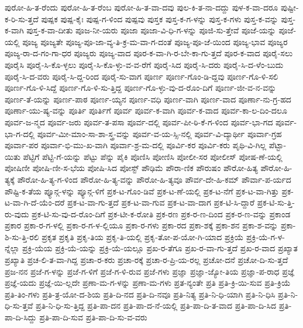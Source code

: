 {ಪುರೋ-ಹಿ-ತ-ರೆಂದು
ಪುರೋ-ಹಿ-ತ-ರೆಂಬ
ಪುರೋ-ಹಿ-ತ-ವಾ-ದವು
ಪುಲ-ಕಿ-ತ-ನಾ-ದದ್ದು
ಪುಳ-ಕ-ವಾ-ದರೂ
ಪುಷ್ಟೀ-ಕ-ರಿ-ಸು-ತ್ತದೆ
ಪುಷ್ಪಕ
ಪುಷ್ಪ-ಕೈಃ
ಪುಷ್ಪ-ಗ-ಳಿಂದ
ಪುಷ್ಪವು
ಪುಸ್ತಕ
ಪುಸ್ತ-ಕ-ಗ-ಳನ್ನು
ಪುಸ್ತ-ಕ-ಗಳು
ಪುಸ್ತ-ಕ-ವನ್ನು
ಪುಸ್ತ-ಕ-ವಾಗಿ
ಪುಸ್ತ-ಕ-ವಾ-ದೀತು
ಪೂಜ-ನೀ-ಯರು
ಪೂಜಾ
ಪೂಜಾ-ವಿ-ಧಿ-ಗ-ಳನ್ನು
ಪೂಜಿ-ಸು-ತ್ತೇವೆ
ಪೂಜೆ-ಯನ್ನು
ಪೂಜೆ-ಯಲ್ಲಿ
ಪೂಜ್ಯ
ಪೂಜ್ಯತೇ
ಪೂಜ್ಯ-ಪೂ-ಜಾ-ವ್ಯ-ತಿ-ಕ್ರ-ಮ-ವಾ-ಗ-ದಂತೆ
ಪೂಜ್ಯ-ಪೂ-ಜೆ-ಯಿಂದ
ಪೂಜ್ಯ-ಭಾವ
ಪೂಜ್ಯರ
ಪೂಜ್ಯ-ರಾ-ದ-ಗಂ-ಗಾ-ಧರ
ಪೂಜ್ಯರು
ಪೂಜ್ಯ-ವಾದ
ಪೂರ-ಕ-ವಾ-ಗಿ-ರ-ಬೇ-ಕಾ-ಗು-ತ್ತದೆ
ಪೂರ-ಕ-ವಾದ
ಪೂರೈ-ಸಲು
ಪೂರೈಸಿ
ಪೂರೈ-ಸಿ-ಕೊ-ಳ್ಳಲು
ಪೂರೈ-ಸಿ-ಕೊ-ಳ್ಳು-ವ-ವ-ರೆಗೆ
ಪೂರೈ-ಸಿದ
ಪೂರೈ-ಸಿ-ದರು
ಪೂರೈ-ಸಿ-ದ-ಳೆಂ-ಬುದು
ಪೂರೈ-ಸಿ-ದ-ವರು
ಪೂರೈ-ಸಿ-ದ್ದ-ರಿಂದ
ಪೂರೈ-ಸು-ವಾಗ
ಪೂರ್ಣ
ಪೂರ್ಣ-ಗೊಂ-ಡಿ-ದ್ದವು
ಪೂರ್ಣ-ಗೊ-ಳಿ-ಸಲಿ
ಪೂರ್ಣ-ಗೊ-ಳಿ-ಸಿದ್ದೆ
ಪೂರ್ಣ-ಗೊ-ಳಿ-ಸು-ತ್ತಿದ್ದ
ಪೂರ್ಣ-ಗೊ-ಳ್ಳು-ವು-ದ-ರೊಂ-ದಿಗೆ
ಪೂರ್ಣ-ಜೀ-ವ-ನ-ವನ್ನು
ಪೂರ್ಣ-ತೆ-ಯನ್ನು
ಪೂರ್ಣ-ಪಾಠ
ಪೂರ್ಣ-ಯ್ಯನ
ಪೂರ್ಣ-ವಧಿ
ಪೂರ್ಣ-ವಾಗಿ
ಪೂರ್ಣ-ವಾದ
ಪೂರ್ಣಾ-ನು-ಗ್ರ-ಹದ
ಪೂರ್ಣಾ-ಯು-ಷ್ಯ-ವನ್ನು
ಪೂರ್ತಿ
ಪೂರ್ತಿಗೆ
ಪೂರ್ವ
ಪೂರ್ವ-ಕ-ವಾಗಿ
ಪೂರ್ವ-ಕ-ವಾದ
ಪೂರ್ವ-ಕಾ-ಲ-ದಿಂ-ದಲೂ
ಪೂರ್ವ-ಜ-ನ್ಮದ
ಪೂರ್ವ-ಜರು
ಪೂರ್ವ-ತ-ಪಸಾ
ಪೂರ್ವ-ದಲ್ಲಿ
ಪೂರ್ವ-ಪೀ-ಠಿ-ಕೆ-ಗ-ಳಿಂದ
ಪೂರ್ವ-ಭಾ-ಗದ
ಪೂರ್ವ-ಭಾ-ಗ-ದಲ್ಲಿ
ಪೂರ್ವ-ಮೀ-ಮಾಂ-ಸಾ-ಶಾ-ಸ್ತ್ರ-ವನ್ನು
ಪೂರ್ವ-ವ-ಯ-ಸ್ಸಿ-ನಲ್ಲಿ
ಪೂರ್ವ-ವಿ-ದ್ಯಾರ್ಥೀ
ಪೂರ್ವಾ-ಗ್ರಹ
ಪೂರ್ವಾ-ಪರ
ಪೂರ್ವಾ-ಭಿ-ಮು-ಖ-ವಾಗಿ
ಪೂರ್ವಾ-ಶ್ರ-ಮ-ದಲ್ಲಿ
ಪೂರ್ವಿ-ಕರ
ಪೂರ್ವಿ-ಕರು
ಪೃಥಿ-ವಿ-ಗಿಲ್ಲ
ಪೆಟ್ಟಾ-ಯಿತು
ಪೆಟ್ಟಿಗೆ
ಪೆಟ್ಟಿ-ಗೆ-ಯನ್ನು
ಪೆಟ್ಟು
ಪೆನ್ನು
ಪೈಕಿ
ಪೊಣಿಸಿ
ಪೋಣಿಸಿ
ಪೋಲೀ-ಸರ
ಪೋಲೀಸ್
ಪೋಷ-ಣೆ-ಯಲ್ಲಿ
ಪೋಷಿಣೀ
ಪೋಷಿ-ಣೀ-ಸ-ಭೆಯ
ಪೋಷಿ-ಸಿದ
ಪೋಸ್ಟ್
ಪೌಢಿಮೆ
ಪೌರಾ-ಣಿಕ
ಪೌರುಷಂ
ಪೌರೋ-ಹಿತ್ಯ
ಪೌರೋ-ಹಿ-ತ್ಯಕ್ಕೆ
ಪೌರೋ-ಹಿ-ತ್ಯ-ಗ-ಳಿಂದ
ಪೌರೋ-ಹಿ-ತ್ಯ-ವನ್ನು
ಪೌರೋ-ಹಿ-ತ್ಯವೂ
ಪೌರ್ವ-ದೇ-ಹಿ-ಕಮ್
ಪೌರ್ವಾ-ಪ-ರ್ಯದ
ಪೌಷ್ಟಿ-ಕ-ತೆಯ
ಪ್ಯೂನ್ಗ-ಳನ್ನು
ಪ್ಯೂನ್ಗ-ಳಿಗೆ
ಪ್ರಕ-ಟ-ಗೊಂ-ಡಿವೆ
ಪ್ರಕ-ಟ-ಣೆ-ಯಲ್ಲಿ
ಪ್ರಕ-ಟ-ನೆಗೆ
ಪ್ರಕ-ಟ-ವಾ-ಗಿತ್ತು
ಪ್ರಕ-ಟ-ವಾ-ಗಿ-ದೆ-ಯೆಂ-ದರೆ
ಪ್ರಕ-ಟ-ವಾ-ಗು-ತ್ತದೆ
ಪ್ರಕ-ಟ-ವಾ-ಗುವ
ಪ್ರಕ-ಟ-ವಾ-ದಾಗ
ಪ್ರಕ-ಟಿ-ಸಿ-ದ್ದಾರೆ
ಪ್ರಕ-ಟಿ-ಸು-ತ್ತಿ-ರು-ವುದು
ಪ್ರಕ-ಟಿ-ಸು-ವು-ದ-ರೊಂ-ದಿಗೆ
ಪ್ರಕ-ಟೀ-ಕ-ರೋತಿ
ಪ್ರಕ-ರಣ
ಪ್ರಕ-ರ-ಣ-ದಿಂದ
ಪ್ರಕ-ರ-ಣ-ವನ್ನು
ಪ್ರಕಾಂಡ
ಪ್ರಕಾರ
ಪ್ರಕಾ-ರ-ಗ-ಳಲ್ಲಿ
ಪ್ರಕಾ-ರ-ಗ-ಳ-ಲ್ಲಿಯೂ
ಪ್ರಕಾ-ರ-ಗಳು
ಪ್ರಕಾ-ರದ
ಪ್ರಕಾ-ಶಕ್ಕೆ
ಪ್ರಕಾ-ಶನ
ಪ್ರಕಾ-ಶ-ವನ್ನು
ಪ್ರಕಾ-ಶಿ-ಸು-ತ್ತಿ-ರಲಿ
ಪ್ರಕೃತ
ಪ್ರಕೃತಿ
ಪ್ರಕೃ-ತಿಯ
ಪ್ರಕೃ-ತಿ-ಯಲ್ಲಿ
ಪ್ರಕೃ-ತೋ-ಪ-ಯೋ-ಗಿ-ಯಾದ
ಪ್ರಕ್ರಿಯೆ
ಪ್ರಕ್ರಿ-ಯೆ-ಗ-ಳ-ನ್ನೆಲ್ಲಾ
ಪ್ರಕ್ರಿ-ಯೆಯ
ಪ್ರಕ್ರಿ-ಯೆ-ಯನ್ನು
ಪ್ರಕ್ರಿ-ಯೆ-ಯಲ್ಲೂ
ಪ್ರಖ-ರ-ತೆಗೂ
ಪ್ರಖ-ರ-ವಾ-ಗು-ತ್ತದೆ
ಪ್ರಖ-ರ-ವಾದ
ಪ್ರಖ್ಯಾತ
ಪ್ರಖ್ಯಾತಿ
ಪ್ರಚ-ಲಿ-ತ-ವಾ-ಗಿದ್ದ
ಪ್ರಚಾ-ರ-ಕರು
ಪ್ರಚಾ-ರಕ್ಕೆ
ಪ್ರಚಾ-ರ-ಪ್ರಿ-ಯ-ರಲ್ಲ
ಪ್ರಚೋ-ದನೆ
ಪ್ರಚೋ-ದಿ-ಸು-ತ್ತದೆ
ಪ್ರಜ-ನನ
ಪ್ರಜೆ-ಗ-ಳನ್ನು
ಪ್ರಜೆ-ಗ-ಳಿಗೆ
ಪ್ರಜೆ-ಗ-ಳಿ-ರುವ
ಪ್ರಜೆ-ಗಳು
ಪ್ರಜ್ಞಾ
ಪ್ರಜ್ಞಾ-ಜ್ಯೋ-ತಿಯ
ಪ್ರಜ್ಞಾ-ಪ-ರಾಧ
ಪ್ರಜ್ಞೆ
ಪ್ರಜ್ಞೆ-ಯದು
ಪ್ರಜ್ಞೆ-ಯಿ-ಲ್ಲದೇ
ಪ್ರಣಾ-ಮ-ಗ-ಳನ್ನು
ಪ್ರಣಾ-ಮ-ಗಳು
ಪ್ರತ-ನ್ಯಂತೇ
ಪ್ರತಿ
ಪ್ರತಿ-ಕ್ರಿ-ಯಿ-ಸುವ
ಪ್ರತಿ-ಕ್ರಿಯೆ
ಪ್ರತಿ-ತಿಂ-ಗಳು
ಪ್ರತಿ-ತ್ರ-ಯೋ-ದ-ಶಿಯ
ಪ್ರತಿ-ದಿ-ನದ
ಪ್ರತಿ-ದಿ-ನವೂ
ಪ್ರತಿ-ನಿತ್ಯ
ಪ್ರತಿ-ನಿ-ಧಿ-ಯಾಗಿ
ಪ್ರತಿ-ನಿ-ಧಿಸಿ
ಪ್ರತಿ-ನಿ-ಧಿ-ಸು-ತ್ತವೆ
ಪ್ರತಿ-ನಿ-ಧಿ-ಸು-ತ್ತಿದ್ದ
ಪ್ರತಿ-ಪಾ-ದನ
ಪ್ರತಿ-ಪಾ-ದ-ನೆ-ಯಲ್ಲಿ
ಪ್ರತಿ-ಪಾ-ದಿ-ತ-ವಾದ
ಪ್ರತಿ-ಪಾ-ದಿ-ಸಿದ
ಪ್ರತಿ-ಪಾ-ದಿ-ಸಿದ್ದು
ಪ್ರತಿ-ಪಾ-ದಿ-ಸುವ
ಪ್ರತಿ-ಪಾ-ದಿ-ಸು-ವ-ವರು
}

